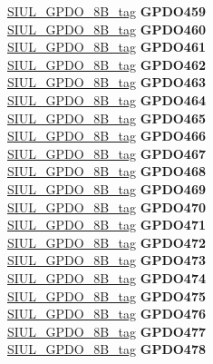 \begin{DoxyCompactItemize}
\begin{tabbing}
\>\>\mbox{\hyperlink{unionSIUL__GPDO__8B__tag}{SIUL\_GPDO\_8B\_tag}} {\bfseries GPDO459}\\
\>\>\mbox{\hyperlink{unionSIUL__GPDO__8B__tag}{SIUL\_GPDO\_8B\_tag}} {\bfseries GPDO460}\\
\>\>\mbox{\hyperlink{unionSIUL__GPDO__8B__tag}{SIUL\_GPDO\_8B\_tag}} {\bfseries GPDO461}\\
\>\>\mbox{\hyperlink{unionSIUL__GPDO__8B__tag}{SIUL\_GPDO\_8B\_tag}} {\bfseries GPDO462}\\
\>\>\mbox{\hyperlink{unionSIUL__GPDO__8B__tag}{SIUL\_GPDO\_8B\_tag}} {\bfseries GPDO463}\\
\>\>\mbox{\hyperlink{unionSIUL__GPDO__8B__tag}{SIUL\_GPDO\_8B\_tag}} {\bfseries GPDO464}\\
\>\>\mbox{\hyperlink{unionSIUL__GPDO__8B__tag}{SIUL\_GPDO\_8B\_tag}} {\bfseries GPDO465}\\
\>\>\mbox{\hyperlink{unionSIUL__GPDO__8B__tag}{SIUL\_GPDO\_8B\_tag}} {\bfseries GPDO466}\\
\>\>\mbox{\hyperlink{unionSIUL__GPDO__8B__tag}{SIUL\_GPDO\_8B\_tag}} {\bfseries GPDO467}\\
\>\>\mbox{\hyperlink{unionSIUL__GPDO__8B__tag}{SIUL\_GPDO\_8B\_tag}} {\bfseries GPDO468}\\
\>\>\mbox{\hyperlink{unionSIUL__GPDO__8B__tag}{SIUL\_GPDO\_8B\_tag}} {\bfseries GPDO469}\\
\>\>\mbox{\hyperlink{unionSIUL__GPDO__8B__tag}{SIUL\_GPDO\_8B\_tag}} {\bfseries GPDO470}\\
\>\>\mbox{\hyperlink{unionSIUL__GPDO__8B__tag}{SIUL\_GPDO\_8B\_tag}} {\bfseries GPDO471}\\
\>\>\mbox{\hyperlink{unionSIUL__GPDO__8B__tag}{SIUL\_GPDO\_8B\_tag}} {\bfseries GPDO472}\\
\>\>\mbox{\hyperlink{unionSIUL__GPDO__8B__tag}{SIUL\_GPDO\_8B\_tag}} {\bfseries GPDO473}\\
\>\>\mbox{\hyperlink{unionSIUL__GPDO__8B__tag}{SIUL\_GPDO\_8B\_tag}} {\bfseries GPDO474}\\
\>\>\mbox{\hyperlink{unionSIUL__GPDO__8B__tag}{SIUL\_GPDO\_8B\_tag}} {\bfseries GPDO475}\\
\>\>\mbox{\hyperlink{unionSIUL__GPDO__8B__tag}{SIUL\_GPDO\_8B\_tag}} {\bfseries GPDO476}\\
\>\>\mbox{\hyperlink{unionSIUL__GPDO__8B__tag}{SIUL\_GPDO\_8B\_tag}} {\bfseries GPDO477}\\
\>\>\mbox{\hyperlink{unionSIUL__GPDO__8B__tag}{SIUL\_GPDO\_8B\_tag}} {\bfseries GPDO478}\\

\end{tabbing}
\end{DoxyCompactItemize}
